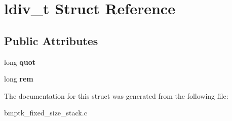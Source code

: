 \hypertarget{structldiv__t}{}\section{ldiv\+\_\+t Struct Reference}
\label{structldiv__t}
\subsection*{Public Attributes}
\begin{DoxyCompactItemize}
\item 
long {\bfseries quot}\hypertarget{structldiv__t_a73efd59c176304c327cb4214d0e5e5c9}{}\label{structldiv__t_a73efd59c176304c327cb4214d0e5e5c9}

\item 
long {\bfseries rem}\hypertarget{structldiv__t_a0f217ff62b8640aa945ec84d6d0bd000}{}\label{structldiv__t_a0f217ff62b8640aa945ec84d6d0bd000}

\end{DoxyCompactItemize}


The documentation for this struct was generated from the following file\+:\begin{DoxyCompactItemize}
\item 
bmptk\+\_\+fixed\+\_\+size\+\_\+stack.\+c\end{DoxyCompactItemize}
